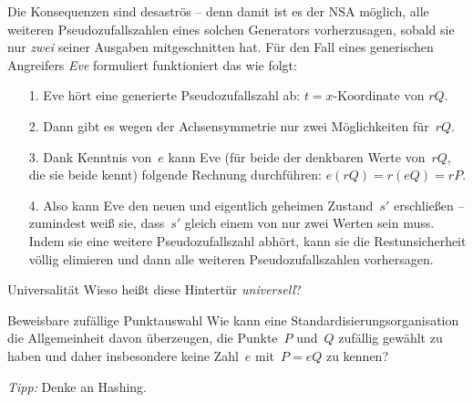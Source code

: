 \documentclass{zirkelblatt}
\begin{document}
Die Konsequenzen sind desaströs -- denn damit ist es der NSA möglich,
alle weiteren Pseudozufallszahlen eines solchen Generators vorherzusagen,
sobald sie nur \emph{zwei} seiner Ausgaben mitgeschnitten hat.
Für den Fall eines generischen Angreifers \emph{Eve} formuliert funktioniert das wie folgt:

\begin{enumerate}
\item[1.] Eve hört eine generierte Pseudozufallszahl ab: $t =
\text{$x$-Koordinate von~$rQ$}$.
\item[2.] Dann gibt es wegen der Achsensymmetrie nur zwei Möglichkeiten
für~$rQ$.
\item[3.] Dank Kenntnis von~$e$ kann Eve (für beide der denkbaren Werte
von~$rQ$, die sie beide kennt) folgende Rechnung durchführen: $e(rQ) = r(eQ) =
rP$.
\item[4.] Also kann Eve den neuen und eigentlich geheimen Zustand~$s'$
erschließen -- zumindest weiß sie, dass~$s'$ gleich einem von nur zwei Werten
sein muss. Indem sie eine weitere Pseudozufallszahl abhört, kann sie die
Restunsicherheit völlig elimieren und dann alle weiteren Pseudozufallszahlen
vorhersagen.
\end{enumerate}

\begin{aufgabeShaded}{Universalität}
Wieso heißt diese Hintertür \emph{universell}?
\end{aufgabeShaded}

\begin{aufgabeShaded}{Beweisbare zufällige Punktauswahl}
Wie kann eine Standardisierungsorganisation die Allgemeinheit davon überzeugen,
die Punkte~$P$ und~$Q$ zufällig gewählt zu haben und daher insbesondere keine
Zahl~$e$ mit~$P = eQ$ zu kennen?

\emph{Tipp:} Denke an Hashing.
\end{aufgabeShaded}

\renewcommand{\thefootnote}{\fnsymbol{footnote}}
\end{document}
